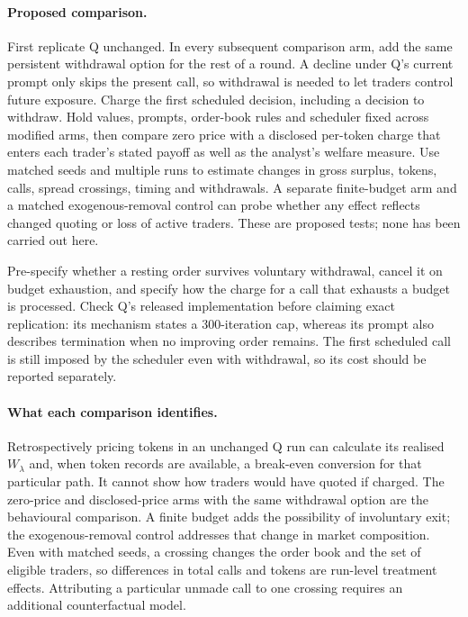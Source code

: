 \documentclass{article}
\begin{document}
\paragraph{Proposed comparison.}
First replicate Q unchanged. In every subsequent comparison arm, add the same persistent withdrawal option for the rest of a round. A decline under Q's current prompt only skips the present call, so withdrawal is needed to let traders control future exposure. Charge the first scheduled decision, including a decision to withdraw. Hold values, prompts, order-book rules and scheduler fixed across modified arms, then compare zero price with a disclosed per-token charge that enters each trader's stated payoff as well as the analyst's welfare measure. Use matched seeds and multiple runs to estimate changes in gross surplus, tokens, calls, spread crossings, timing and withdrawals. A separate finite-budget arm and a matched exogenous-removal control can probe whether any effect reflects changed quoting or loss of active traders. These are proposed tests; none has been carried out here. %

Pre-specify whether a resting order survives voluntary withdrawal, cancel it on budget exhaustion, and specify how the charge for a call that exhausts a budget is processed. Check Q's released implementation before claiming exact replication: its mechanism states a 300-iteration cap, whereas its prompt also describes termination when no improving order remains. The first scheduled call is still imposed by the scheduler even with withdrawal, so its cost should be reported separately. %

\paragraph{What each comparison identifies.}
Retrospectively pricing tokens in an unchanged Q run can calculate its realised \(W_{\lambda}\) and, when token records are available, a break-even conversion for that particular path. It cannot show how traders would have quoted if charged. The zero-price and disclosed-price arms with the same withdrawal option are the behavioural comparison. A finite budget adds the possibility of involuntary exit; the exogenous-removal control addresses that change in market composition. Even with matched seeds, a crossing changes the order book and the set of eligible traders, so differences in total calls and tokens are run-level treatment effects. Attributing a particular unmade call to one crossing requires an additional counterfactual model. %
\end{document}
